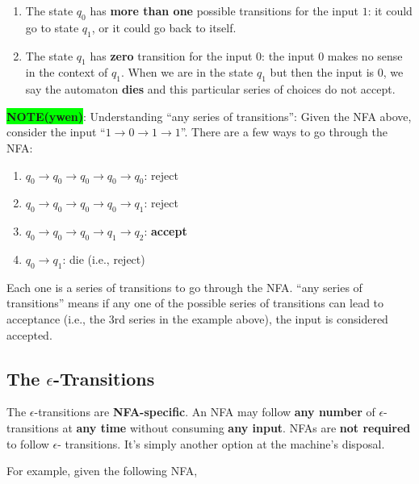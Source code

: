 \documentclass[12pt, letterpaper, oneside]{book}
\begin{document}
\begin{enumerate}
  \item The state $q_0$ has \textbf{more than one} possible transitions for the input $1$: it could go to state $q_1$,
        or it could go back to itself.
  \item The state $q_1$ has \textbf{zero} transition for the input $0$: the input $0$ makes no sense in the context of
        $q_1$. When we are in the state $q_1$ but then the input is $0$, we say the automaton \textbf{dies} and this
        particular series of choices do not accept.
\end{enumerate}

\colorbox{lime}{\textbf{NOTE(ywen)}}: Understanding ``any series of transitions'': Given the NFA above, consider the
input ``$1 \rightarrow 0 \rightarrow 1 \rightarrow 1$''. There are a few ways to go through the NFA:

\begin{enumerate}
  \item $q_0 \rightarrow q_0 \rightarrow q_0 \rightarrow q_0 \rightarrow q_0$: reject
  \item $q_0 \rightarrow q_0 \rightarrow q_0 \rightarrow q_0 \rightarrow q_1$: reject
  \item $q_0 \rightarrow q_0 \rightarrow q_0 \rightarrow q_1 \rightarrow q_2$: \textbf{accept}
  \item $q_0 \rightarrow q_1 $: die (i.e., reject)
\end{enumerate}

Each one is a series of transitions to go through the NFA. ``any series of transitions'' means if any one of the
possible series of transitions can lead to acceptance (i.e., the 3rd series in the example above), the input is
considered accepted.

\subsection{The \texorpdfstring{$\epsilon$}{}-Transitions}

The $\epsilon$-transitions are \textbf{NFA-specific}. An NFA may follow \textbf{any number} of $\epsilon$-transitions
at \textbf{any time} without consuming \textbf{any input}. NFAs are \textbf{not required} to follow $\epsilon$-
transitions. It's simply another option at the machine's disposal.

For example, given the following NFA,
\end{document}
